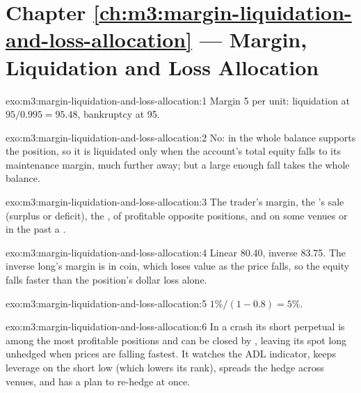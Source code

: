 \section*{Chapter \ref{ch:m3:margin-liquidation-and-loss-allocation} --- Margin, Liquidation and Loss Allocation}

\begin{solution}{exo:m3:margin-liquidation-and-loss-allocation:1}
Margin 5 per unit: liquidation at $95/0.995 = 95.48$, bankruptcy at 95.
\end{solution}

\begin{solution}{exo:m3:margin-liquidation-and-loss-allocation:2}
No: in  the whole balance supports the position, so it is liquidated only when the account's total equity
falls to its maintenance margin, much further away; but a large enough fall takes the whole balance.
\end{solution}

\begin{solution}{exo:m3:margin-liquidation-and-loss-allocation:3}
The trader's margin, the 's sale (surplus or deficit), the ,  of
profitable opposite positions, and on some venues or in the past a .
\end{solution}

\begin{solution}{exo:m3:margin-liquidation-and-loss-allocation:4}
Linear 80.40, inverse 83.75. The inverse long's margin is in coin, which loses value as the price falls, so the equity
falls faster than the position's dollar loss alone.
\end{solution}

\begin{solution}{exo:m3:margin-liquidation-and-loss-allocation:5}
$1\%/(1 - 0.8) = 5\%$.
\end{solution}

\begin{solution}{exo:m3:margin-liquidation-and-loss-allocation:6}
In a crash its short perpetual is among the most profitable positions and can be closed by , leaving
its spot long unhedged when prices are falling fastest. It watches the ADL indicator, keeps leverage on the short low
(which lowers its rank), spreads the hedge across venues, and has a plan to re-hedge at once.
\end{solution}

